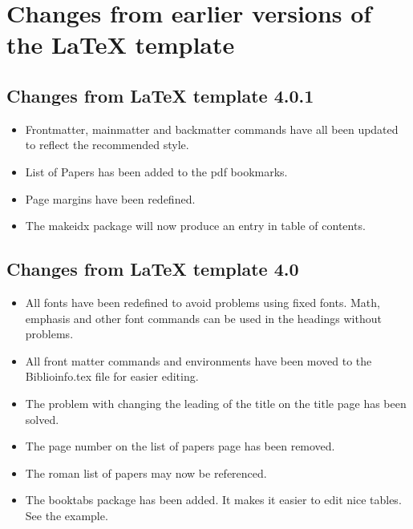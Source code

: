 \section{Changes from earlier versions of the \LaTeX{} template}

\subsection{Changes from \LaTeX{} template 4.0.1}
\begin{itemize} 
\item Frontmatter, mainmatter and backmatter commands have all been updated to reflect the recommended style.
\item List of Papers has been added to the pdf bookmarks.
\item Page margins have been redefined.
\item The makeidx package will now produce an entry in table of contents.
\end{itemize} 


\subsection{Changes from \LaTeX{} template 4.0}
\begin{itemize} 
\item All fonts have been redefined to avoid problems using fixed fonts. Math, emphasis and other font commands can be used in the headings without problems.
\item All front matter commands and environments have been moved to the Biblioinfo.tex file for easier editing.
\item The problem with changing the leading of the title on the title page has been solved.
\item The page number on the list of papers page has been removed.
\item The roman list of papers may now be referenced.
\item The booktabs package has been added. It makes it easier to edit nice tables. See the example.
\end{itemize} 


